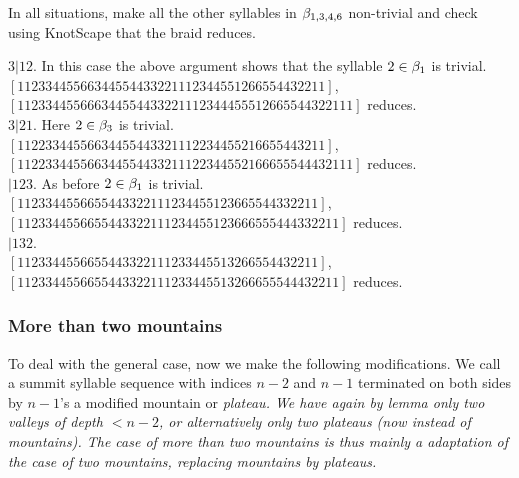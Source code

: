 \begin{caselist}
\begin{caselist}
In all situations,
make all the other syllables in $\beta_{1,3,4,6}$ non-trivial and
check using KnotScape that the braid reduces. 


\begin{caselist}
\case $ 3| 12$. In this case the above argument shows that the
syllable $2\in\beta_1$ is trivial.
\\
$[11233445566  344 55443322111 234455   12 66554432211]$, \\
$[112334455666 344 55443322111 23444555 12 665544322111]$ reduces. \\
\case $ 3| 21$. Here $2\in\beta_3$ is trivial.
\\
$[112233445566 344 5544332111 2234455 21 6655443211]$, \\
$[112233445566 344 5544332111 2234455 21 66655544432111]$ reduces. \\
\case $| 123$. As before $2\in\beta_1$ is trivial.
\\
$[11233445566 55443322111 234455 123 665544332211]$, \\
$[11233445566 55443322111 234455 123 666555444332211]$ reduces. \\
\case $| 132$.
\\
$[11233445566 55443322111 2334455 132 66554432211]$, \\
$[11233445566 55443322111 2334455 132 66655544432211]$ reduces. \\
\end{caselist}
\end{caselist}

\end{caselist}

\subsubsection{More than two mountains\label{S4.2}}

To deal with the general case, 
now we make the following modifications. We call a
summit syllable sequence with indices $n-2$ and $n-1$
terminated on both sides by $n-1$'s a modified
mountain or \em{plateau}. We have again by lemma
 only two valleys of depth $<n-2$,
or alternatively only two plateaus (now instead of mountains).
The case of more than two mountains is thus mainly a
adaptation of the case of two mountains, replacing
mountains by plateaus.

